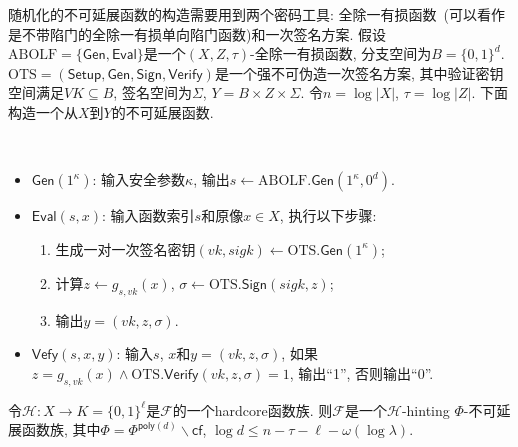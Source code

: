 随机化的不可延展函数的构造需要用到两个密码工具: 全除一有损函数~\cite{Qin-PKC-2014}(可以看作是不带陷门的全除一有损单向陷门函数)和一次签名方案. 假设$\text{ABOLF} = \{\mathsf{Gen}, \mathsf{Eval}\}$是一个$(X, Z, \tau)$-全除一有损函数, 分支空间为$B = \{0,1\}^d$. $\text{OTS} = (\mathsf{Setup}, \mathsf{Gen}, \mathsf{Sign}, \mathsf{Verify})$是一个强不可伪造一次签名方案, 其中验证密钥空间满足$VK \subseteq B$, 签名空间为$\Sigma$, $Y = B \times Z \times \Sigma$. 令$n = \log |X|$, $\tau = \log |Z|$. 下面构造一个从$X$到$Y$的不可延展函数.    
\begin{construction}[随机化的不可延展函数]~\label{con:R-NMF}
\begin{itemize} 
\item $\mathsf{Gen}(1^\kappa)$: 输入安全参数$\kappa$, 输出$s \leftarrow \text{ABOLF}.\mathsf{Gen}(1^\kappa, 0^d)$. 

\item $\mathsf{Eval}(s, x)$: 输入函数索引$s$和原像$x \in X$, 执行以下步骤:
\begin{enumerate}
\item 生成一对一次签名密钥$(vk, sigk) \leftarrow \text{OTS}.\mathsf{Gen}(1^\kappa)$;

\item 计算$z \leftarrow g_{s, vk}(x)$, $\sigma \leftarrow \text{OTS}.\mathsf{Sign}(sigk, z)$;

\item 输出$y = (vk, z, \sigma)$. 
\end{enumerate} 

\item $\mathsf{Vefy}(s, x, y)$: 输入$s$, $x$和$y = (vk, z, \sigma)$, 如果$z = g_{s, vk}(x) \wedge \text{OTS}.\mathsf{Verify}(vk, z, \sigma) = 1$, 输出``1'', 否则输出``0''.     
\end{itemize}
\end{construction}


\begin{theorem}
令$\mathcal{H}: X \rightarrow K=\{0, 1\}^\ell$是$\mathcal{F}$的一个hardcore函数族. 则$\mathcal{F}$是一个$\mathcal{H}$-hinting $\Phi$-不可延展函数族, 其中$\Phi = \Phi^{\mathsf{poly}(d)} \backslash \mathsf{cf}$, $\log d \leq n-\tau-\ell-\omega(\log \lambda)$.  
\end{theorem}

